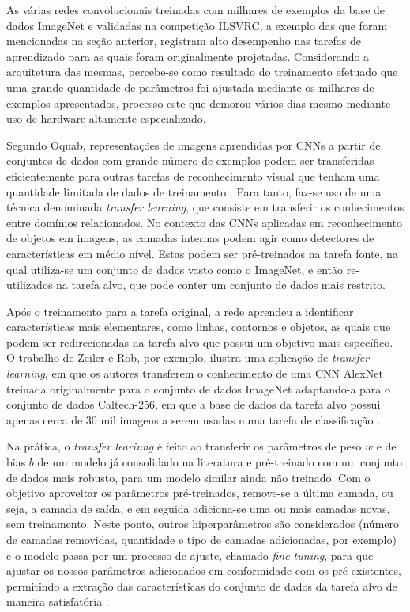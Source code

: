 As várias redes convolucionais treinadas com milhares de exemplos da base de dados  ImageNet e validadas na competição ILSVRC, a exemplo das que foram mencionadas na seção anterior, registram alto desempenho nas tarefas de aprendizado para as quais foram originalmente projetadas. Considerando a arquitetura das mesmas, percebe-se como resultado do treinamento efetuado que uma grande quantidade de parâmetros foi ajustada mediante os milhares de exemplos apresentados, processo este que demorou vários dias mesmo mediante uso de hardware altamente especializado.

Segundo Oquab, representações de imagens aprendidas por CNNs a partir de conjuntos de dados com grande número de exemplos podem ser transferidas eficientemente para outras tarefas de reconhecimento visual que tenham uma quantidade limitada de dados de treinamento \cite{oquab2014learning}. Para tanto, faz-se uso de uma técnica denominada \emph{transfer learning}, que consiste em transferir os conhecimentos entre domínios relacionados. No contexto das CNNs aplicadas em reconhecimento de objetos em imagens, as camadas internas podem agir como detectores de características em médio nível. Estas podem ser pré-treinados na tarefa fonte, na qual utiliza-se um conjunto de dados vasto como o ImageNet, e então re-utilizados na tarefa alvo, que pode conter um conjunto de dados mais restrito.

Após o treinamento para a tarefa original, a rede aprendeu a identificar características mais elementares, como linhas, contornos e objetos, as quais que podem ser redirecionadas na tarefa alvo que possui um objetivo mais específico. O trabalho de Zeiler e Rob, por exemplo, ilustra uma aplicação de \emph{transfer learning}, em que os autores transferem o conhecimento de uma CNN AlexNet treinada originalmente para o conjunto de dados ImageNet adaptando-a para o conjunto de dados Caltech-256, em que a base de dados da tarefa alvo possui apenas cerca de 30 mil imagens a serem usadas numa tarefa de classificação \cite{zeiler2014visualizing}.

Na prática, o \emph{transfer learinng} é feito ao transferir os parâmetros de peso $w$ e de bias $b$ de um modelo já consolidado na literatura e pré-treinado com um conjunto de dados mais robusto, para um modelo similar ainda não treinado. Com o objetivo aproveitar os parâmetros pré-treinados, remove-se a última camada, ou seja, a camada de saída, e em seguida adiciona-se uma ou mais camadas novas, sem treinamento. Neste ponto, outros hiperparâmetros são considerados (número de camadas removidas, quantidade e tipo de camadas adicionadas, por exemplo) e o modelo passa por um processo de ajuste, chamado \emph{fine tuning}, para que ajustar os nossos parâmetros adicionados em conformidade com os pré-existentes, permitindo a extração das características do conjunto de dados da tarefa alvo de maneira satisfatória \cite{oquab2014learning}.

